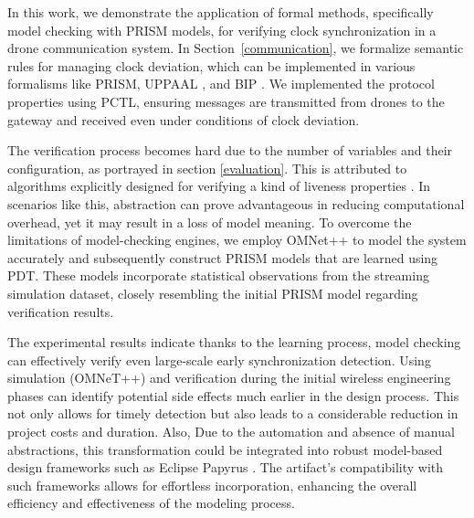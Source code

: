



In this work, we demonstrate the application of formal methods, specifically model checking with PRISM models, for verifying clock synchronization in a drone communication system. In Section~\ref{communication}, we formalize semantic rules for managing clock deviation, which can be implemented in various formalisms like PRISM, UPPAAL \cite{behrmann2006uppaal}, and BIP \cite{basurigorous2011}. We implemented the protocol properties using PCTL, ensuring messages are transmitted from drones to the gateway and received even under conditions of clock deviation. 




The verification process becomes hard due to the number of variables and their configuration, as portrayed in section \ref{evaluation}. This is attributed to algorithms explicitly designed for verifying a kind of liveness properties \cite{alur2015}. In scenarios like this, abstraction can prove advantageous in reducing computational overhead, yet it may result in a loss of model meaning. To overcome the limitations of model-checking engines, we employ OMNet++ to model the system accurately and subsequently construct PRISM models that are learned using PDT. These models incorporate statistical observations from the streaming simulation dataset, closely resembling the initial PRISM model regarding verification results.

The experimental results indicate thanks to the learning process, model checking can effectively verify even large-scale early synchronization detection. Using simulation (OMNeT++) and verification during the initial wireless engineering phases can identify potential side effects much earlier in the design process. This not only allows for timely detection but also leads to a considerable reduction in project costs and duration. Also, Due to the automation and absence of manual abstractions, this transformation could be integrated into robust model-based design frameworks such as Eclipse Papyrus \cite{papyrus}. The artifact's compatibility with such frameworks allows for effortless incorporation, enhancing the overall efficiency and effectiveness of the modeling process.


